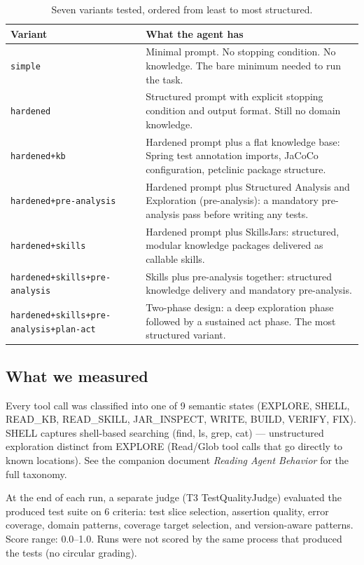 \documentclass[11pt,a4paper]{article}
\begin{document}
\begin{table}[H]
\centering
\renewcommand{\arraystretch}{1.2}
\begin{tabular}{@{}l p{9cm}@{}}
\toprule
\textbf{Variant} & \textbf{What the agent has} \\
\midrule
\texttt{simple}
  & Minimal prompt. No stopping condition. No knowledge.
    The bare minimum needed to run the task. \\
\texttt{hardened}
  & Structured prompt with explicit stopping condition and output format.
    Still no domain knowledge. \\
\texttt{hardened+kb}
  & Hardened prompt plus a flat knowledge base: Spring test annotation imports,
    JaCoCo configuration, petclinic package structure. \\
\texttt{hardened+pre-analysis}
  & Hardened prompt plus Structured Analysis and Exploration (pre-analysis):
    a mandatory pre-analysis pass before writing any tests. \\
\texttt{hardened+skills}
  & Hardened prompt plus SkillsJars: structured, modular knowledge packages
    delivered as callable skills. \\
\texttt{hardened+skills+pre-analysis}
  & Skills plus pre-analysis together: structured knowledge delivery and
    mandatory pre-analysis. \\
\texttt{hardened+skills+pre-analysis+plan-act}
  & Two-phase design: a deep exploration phase followed by a sustained act phase.
    The most structured variant. \\
\bottomrule
\end{tabular}
\caption{Seven variants tested, ordered from least to most structured.}
\end{table}

\subsection*{What we measured}

Every tool call was classified into one of 9 semantic states
(EXPLORE, SHELL, READ\_KB, READ\_SKILL, JAR\_INSPECT, WRITE, BUILD, VERIFY, FIX).
SHELL captures shell-based searching (find, ls, grep, cat) --- unstructured exploration
distinct from EXPLORE (Read/Glob tool calls that go directly to known locations).
See the companion document \emph{Reading Agent Behavior} for the full taxonomy.

At the end of each run, a separate judge (T3 TestQualityJudge) evaluated
the produced test suite on 6 criteria: test slice selection, assertion quality,
error coverage, domain patterns, coverage target selection, and version-aware patterns.
Score range: 0.0--1.0. Runs were not scored by the same process that produced the tests
(no circular grading).
\end{document}

